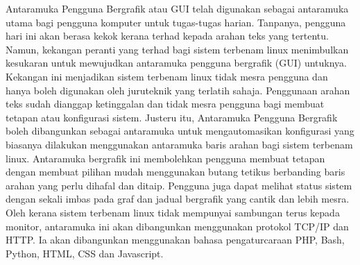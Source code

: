 \begin{abstrak} Antaramuka Pengguna Bergrafik atau GUI telah digunakan sebagai antaramuka utama bagi pengguna komputer untuk tugas-tugas harian. Tanpanya, pengguna hari ini akan berasa kekok kerana terhad kepada arahan teks yang tertentu. Namun, kekangan peranti yang terhad bagi sistem terbenam linux menimbulkan kesukaran untuk mewujudkan antaramuka pengguna bergrafik (GUI) untuknya. Kekangan ini menjadikan sistem terbenam linux tidak mesra pengguna dan hanya boleh digunakan oleh juruteknik yang terlatih sahaja. Penggunaan arahan teks sudah dianggap ketinggalan dan tidak mesra pengguna bagi membuat tetapan atau konfigurasi sistem. Justeru itu, Antaramuka Pengguna Bergrafik boleh dibangunkan sebagai antaramuka untuk mengautomasikan konfigurasi yang biasanya dilakukan menggunakan antaramuka baris arahan bagi sistem terbenam linux. Antaramuka bergrafik ini membolehkan pengguna membuat tetapan dengan membuat pilihan mudah menggunakan butang tetikus berbanding baris arahan yang perlu dihafal dan ditaip. Pengguna juga dapat melihat status sistem dengan sekali imbas pada graf dan jadual bergrafik yang cantik dan lebih mesra. Oleh kerana sistem terbenam linux tidak mempunyai sambungan terus kepada monitor, antaramuka ini akan dibangunkan menggunakan protokol TCP/IP dan HTTP. Ia akan dibangunkan menggunakan bahasa pengaturcaraan PHP, Bash, Python, HTML, CSS dan Javascript.

\end{abstrak}
